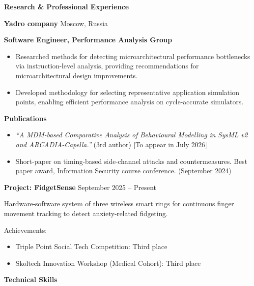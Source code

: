 \documentclass[11pt]{article}
\begin{document}
\begin{center}
    \textbf{Research \& Professional Experience}
\end{center}

\textbf{Yadro company} \hfill Moscow, Russia

\textbf{Software Engineer, Performance Analysis Group}
\begin{itemize}[noitemsep, topsep=0pt, partopsep=0pt, parsep=0pt]
    \item Researched methods for detecting microarchitectural performance bottlenecks via instruction-level analysis, providing recommendations for microarchitectural design improvements.
    \item Developed methodology for selecting representative application simulation points, enabling efficient performance analysis on cycle-accurate simulators.
\end{itemize}

\vspace{12pt}

\textbf{Publications}

\begin{itemize}[noitemsep, topsep=0pt, partopsep=0pt, parsep=0pt]
    \item \textit{``A MDM-based Comparative Analysis of Behavioural Modelling in SysML v2 and ARCADIA-Capella.''} (3rd author) [To appear in July 2026]
    \item Short-paper on timing-based side-channel attacks and countermeasures. Best paper award, Information Security course conference. \href{https://github.com/denisboborukhin/timing_attacks/blob/main/main.pdf}{(September 2024)}
\end{itemize}

\vspace{12pt}
\textbf{Project: FidgetSense} \hfill September 2025 -- Present

Hardware-software system of three wireless smart rings for continuous finger movement tracking to detect anxiety-related fidgeting.

Achievements:
\begin{itemize}[noitemsep, topsep=0pt, partopsep=0pt, parsep=0pt]
    \item Triple Point Social Tech Competition: Third place
    \item Skoltech Innovation Workshop (Medical Cohort): Third place
\end{itemize}

\begin{center}
    \textbf{Technical Skills}
\end{center}
\end{document}
